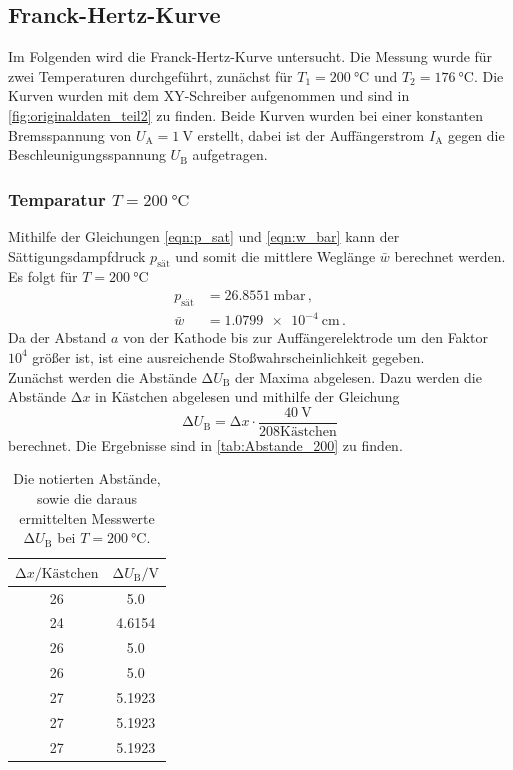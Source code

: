 \subsection{Franck-Hertz-Kurve}
Im Folgenden wird die Franck-Hertz-Kurve untersucht.
Die Messung wurde für zwei Temperaturen durchgeführt, zunächst für $T_1 = \SI{200}{\celsius}$ und $T_2 = \SI{176}{\celsius}$.
Die Kurven wurden mit dem XY-Schreiber aufgenommen und sind in \autoref{fig:originaldaten_teil2} zu finden.
Beide Kurven wurden bei einer konstanten Bremsspannung von $U_\text{A}  = \SI{1}{\volt}$ erstellt, dabei ist der Auffängerstrom $I_\text{A}$ gegen die Beschleunigungsspannung $U_\text{B}$ aufgetragen.

\subsubsection{Temparatur $T = \SI{200}{\celsius}$}
Mithilfe der Gleichungen \eqref{eqn:p_sat} und \eqref{eqn:w_bar} kann der Sättigungsdampfdruck $p_\text{sät}$ und somit die mittlere Weglänge $\bar{w}$ berechnet werden.
Es folgt für $T = \SI{200}{\celsius}$
\begin{align*}
    p_\text{sät} &= \SI{26.8551}{\milli\bar} \, , \\
    \bar{w} &= \SI{1.0799e-4}{\centi\metre} \, .
\end{align*}
Da der Abstand $a$ von der Kathode bis zur Auffängerelektrode um den Faktor $10^4$ größer ist, ist eine ausreichende Stoßwahrscheinlichkeit gegeben.\\

\noindent
Zunächst werden die Abstände $\increment U_\text{B}$ der Maxima abgelesen.
Dazu werden die Abstände $\increment x$ in Kästchen abgelesen und mithilfe der Gleichung
\begin{equation}
    \label{eqn:delta_U_B}
    \increment U_\text{B} = \increment x \cdot \frac{\SI{40}{\volt}}{208 \text{Kästchen}}
\end{equation}
berechnet.
Die Ergebnisse sind in \autoref{tab:Abstande_200} zu finden.

\begin{table}
    \centering
    \caption{Die notierten Abstände, sowie die daraus ermittelten Messwerte $\increment U_\text{B}$ bei $T=\SI{200}{\celsius}$.} 
    \label{tab:Abstande_200}
    \begin{tabular}{c S[table-format=1.4]}
    \toprule
    $\increment x /\text{Kästchen}$ & $\increment U_\text{B} / \si{\volt}$\\
     &  5.0\\
      24 &  4.6154\\
      26 &  5.0\\
      26 &  5.0\\
      27 &  5.1923\\
      27 &  5.1923\\
      27 &  5.1923\\
    \bottomrule
    \end{tabular}
\end{table}

